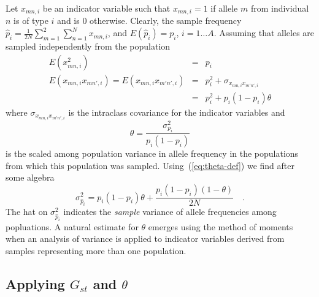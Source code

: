 Let $x_{mn,i}$ be an indicator variable such that $x_{mn,i} = 1$ if
allele $m$ from individual $n$ is of type $i$ and is 0
otherwise. Clearly, the sample frequency $\hat p_i =
\frac{1}{2N}\sum_{m=1}^2\sum_{n=1}^Nx_{mn,i}$, and $E(\hat p_i) =
p_i$, $i=1\dots A$. Assuming that alleles are sampled independently
from the population
\begin{eqnarray*}
E(x^2_{mn,i}) &=& p_i \\
E(x_{mn,i}x_{mn',i}) = E(x_{mn,i}x_{m'n',i}) &=& p_i^2 + \sigma_{x_{mn,i}x_{m'n',i}} \\
&=& p_i^2 + p_i(1-p_i)\theta
\end{eqnarray*}
where $\sigma_{x_{mn,i}x_{m'n',i}}$ is the intraclass covariance for
the indicator variables and
\begin{equation}
\theta = \frac{\sigma^2_{p_i}}{p_i(1-p_i)} \label{eq:theta-def}
\end{equation}
is the scaled among population variance in allele frequency in the
populations from which this population was
sampled. Using~(\ref{eq:theta-def}) we find after some algebra
\[
\sigma^2_{\hat p_i} = p_i(1-p_i)\theta +
\frac{p_i(1-p_i)(1-\theta)}{2N} \quad .
\]
The hat on $\sigma^2_{\hat p_i}$ indicates the {\it sample\/} variance
of allele frequencies among popluations. A natural estimate for
$\theta$ emerges using the method of moments when an analysis of
variance is applied to indicator variables derived from samples
representing more than one population.

\subsection*{Applying $G_{st}$ and $\theta$}

